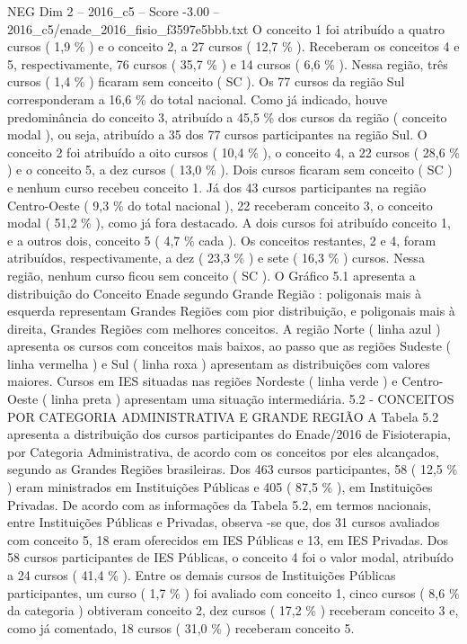 \begin{textsample}{NEG Dim 2 – 2016\_c5 – Score -3.00 – 2016\_c5/enade\_2016\_fisio\_f3597e5bbb.txt}
O conceito 1 foi atribuído a quatro cursos ( 1,9 \% ) e o conceito 2, a 27 cursos ( 12,7 \% ).
Receberam os conceitos 4 e 5, respectivamente, 76 cursos ( 35,7 \% ) e 14 cursos ( 6,6 \% ).
Nessa região, três cursos ( 1,4 \% ) ficaram sem conceito ( SC ).
Os 77 cursos da região Sul corresponderam a 16,6 \% do total nacional.
Como já indicado, houve predominância do conceito 3, atribuído a 45,5 \% dos cursos da região ( conceito modal ), ou seja, atribuído a 35 dos 77 cursos participantes na região Sul.
O conceito 2 foi atribuído a oito cursos ( 10,4 \% ), o conceito 4, a 22 cursos ( 28,6 \% ) e o conceito 5, a dez cursos ( 13,0 \% ).
Dois cursos ficaram sem conceito ( SC ) e nenhum curso recebeu conceito 1.
Já dos 43 cursos participantes na região Centro-Oeste ( 9,3 \% do total nacional ), 22 receberam conceito 3, o conceito modal ( 51,2 \% ), como já fora destacado.
A dois cursos foi atribuído conceito 1, e a outros dois, conceito 5 ( 4,7 \% cada ).
Os conceitos restantes, 2 e 4, foram atribuídos, respectivamente, a dez ( 23,3 \% ) e sete ( 16,3 \% ) cursos.
Nessa região, nenhum curso ficou sem conceito ( SC ).
O Gráfico 5.1 apresenta a distribuição do Conceito Enade segundo Grande Região : poligonais mais à esquerda representam Grandes Regiões com pior distribuição, e poligonais mais à direita, Grandes Regiões com melhores conceitos.
A região Norte ( linha azul ) apresenta os cursos com conceitos mais baixos, ao passo que as regiões Sudeste ( linha vermelha ) e Sul ( linha roxa ) apresentam as distribuições com valores maiores.
Cursos em IES situadas nas regiões Nordeste ( linha verde ) e Centro-Oeste ( linha preta ) apresentam uma situação intermediária. 5.2 - CONCEITOS POR CATEGORIA ADMINISTRATIVA E GRANDE REGIÃO A Tabela 5.2 apresenta a distribuição dos cursos participantes do Enade/2016 de Fisioterapia, por Categoria Administrativa, de acordo com os conceitos por eles alcançados, segundo as Grandes Regiões brasileiras.
Dos 463 cursos participantes, 58 ( 12,5 \% ) eram ministrados em Instituições Públicas e 405 ( 87,5 \% ), em Instituições Privadas.
De acordo com as informações da Tabela 5.2, em termos nacionais, entre Instituições Públicas e Privadas, observa -se que, dos 31 cursos avaliados com conceito 5, 18 eram oferecidos em IES Públicas e 13, em IES Privadas.
Dos 58 cursos participantes de IES Públicas, o conceito 4 foi o valor modal, atribuído a 24 cursos ( 41,4 \% ).
Entre os demais cursos de Instituições Públicas participantes, um curso ( 1,7 \% ) foi avaliado com conceito 1, cinco cursos ( 8,6 \% da categoria ) obtiveram conceito 2, dez cursos ( 17,2 \% ) receberam conceito 3 e, como já comentado, 18 cursos ( 31,0 \% ) receberam conceito 5.

\end{textsample}
